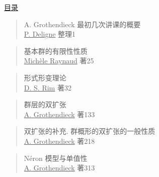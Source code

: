 {}
\thispagestyle{empty}
\begin{center}
\underline{目录}
\end{center}
\vspace{0.5em}

\noindent{}
\begin{quote}
A. Grothendieck 最初几次讲课的概要\\
\underline{P. Deligne} 整理\hfill 1
\end{quote}

\noindent{}
\begin{quote}
基本群的有限性性质\\
\underline{Mich\`ele Raynaud} 著\hfill 25
\end{quote}

\noindent{}
\begin{quote}
形式形变理论\\
\underline{D. S. Rim} 著\hfill 32
\end{quote}

\noindent{}
\begin{quote}
群层的双扩张\\
\underline{A. Grothendieck} 著\hfill 133
\end{quote}

\noindent{}
\begin{quote}
双扩张的补充. 群概形的双扩张的一般性质\\
\underline{A. Grothendieck} 著\hfill 218
\end{quote}

\noindent{}
\begin{quote}
N\'eron 模型与单值性\\
\underline{A. Grothendieck} 著\hfill 313
\end{quote}
